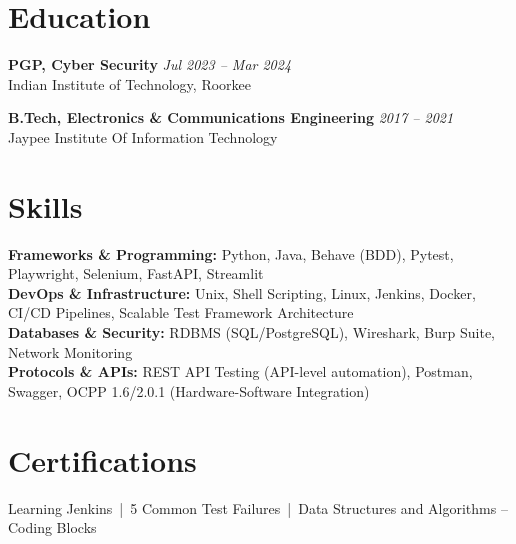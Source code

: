 \documentclass[a4paper,10pt]{article}
\begin{document}
\section{Education}

\textbf{PGP, Cyber Security} \hfill \textit{Jul 2023 -- Mar 2024}\\
Indian Institute of Technology, Roorkee

\textbf{B.Tech, Electronics \& Communications Engineering} \hfill \textit{2017 -- 2021}\\
Jaypee Institute Of Information Technology

\section{Skills}

\textbf{Frameworks \& Programming:} Python, Java, Behave (BDD), Pytest, Playwright, Selenium, FastAPI, Streamlit\\
\textbf{DevOps \& Infrastructure:} Unix, Shell Scripting, Linux, Jenkins, Docker, CI/CD Pipelines, Scalable Test Framework Architecture\\
\textbf{Databases \& Security:} RDBMS (SQL/PostgreSQL), Wireshark, Burp Suite, Network Monitoring\\
\textbf{Protocols \& APIs:} REST API Testing (API-level automation), Postman, Swagger, OCPP 1.6/2.0.1 (Hardware-Software Integration)

\section{Certifications}
Learning Jenkins \,|\, 5 Common Test Failures \,|\, Data Structures and Algorithms -- Coding Blocks
\end{document}
